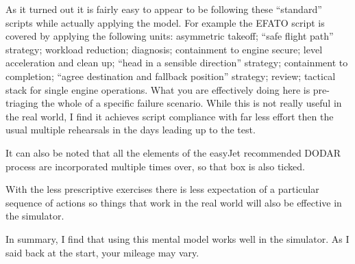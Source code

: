 \documentclass[a5paper,11pt,titlepage]{article}
\begin{document}
As it turned out it is fairly easy to appear to be following these
``standard'' scripts while actually applying the model. For example the
EFATO script is covered by applying the following units: asymmetric
takeoff; ``safe flight path'' strategy; workload reduction; diagnosis;
containment to engine secure; level acceleration and clean up; ``head in
a sensible direction'' strategy; containment to completion; ``agree
destination and fallback position'' strategy; review; tactical stack for
single engine operations. What you are effectively doing here is
pre-triaging the whole of a specific failure scenario. While this is not
really useful in the real world, I find it achieves script compliance
with far less effort then the usual multiple rehearsals in the days
leading up to the test.

It can also be noted that all the elements of the easyJet recommended
DODAR process are incorporated multiple times over, so that box is also
ticked.

With the less prescriptive exercises there is less expectation of a
particular sequence of actions so things that work in the real world
will also be effective in the simulator.

In summary, I find that using this mental model works well in the
simulator. As I said back at the start, your mileage may vary.
\end{document}
